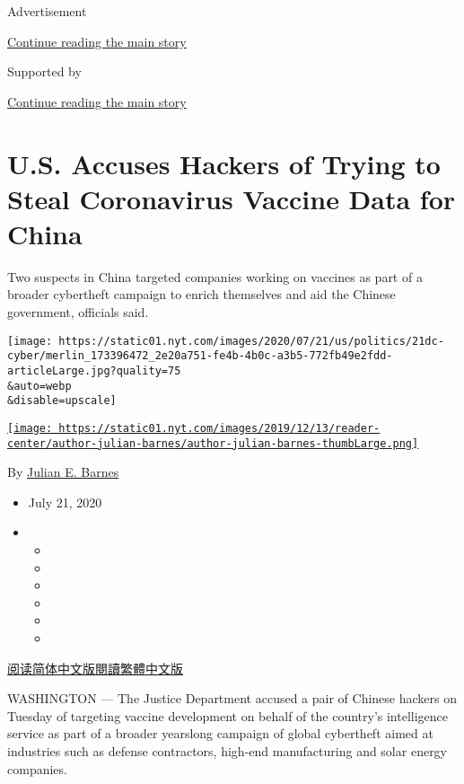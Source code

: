 Advertisement

\protect\hyperlink{after-top}{Continue reading the main story}

Supported by

\protect\hyperlink{after-sponsor}{Continue reading the main story}

\hypertarget{us-accuses-hackers-of-trying-to-steal-coronavirus-vaccine-data-for-china}{%
\section{U.S. Accuses Hackers of Trying to Steal Coronavirus Vaccine
Data for
China}\label{us-accuses-hackers-of-trying-to-steal-coronavirus-vaccine-data-for-china}}

Two suspects in China targeted companies working on vaccines as part of
a broader cybertheft campaign to enrich themselves and aid the Chinese
government, officials said.

\texttt{[image: https://static01.nyt.com/images/2020/07/21/us/politics/21dc-cyber/merlin\_173396472\_2e20a751-fe4b-4b0c-a3b5-772fb49e2fdd-articleLarge.jpg?quality=75\\\&auto=webp\\\&disable=upscale]}

\href{https://www.nytimes.com/by/julian-e-barnes}{\texttt{[image: https://static01.nyt.com/images/2019/12/13/reader-center/author-julian-barnes/author-julian-barnes-thumbLarge.png]}}

By \href{https://www.nytimes.com/by/julian-e-barnes}{Julian E. Barnes}

\begin{itemize}
\item
  July 21, 2020
\item
  \begin{itemize}
  \item
  \item
  \item
  \item
  \item
  \item
  \end{itemize}
\end{itemize}

\href{https://cn.nytimes.com/usa/20200722/china-hacking-coronavirus-vaccine/}{阅读简体中文版}\href{https://cn.nytimes.com/usa/20200722/china-hacking-coronavirus-vaccine/zh-hant/}{閱讀繁體中文版}

WASHINGTON --- The Justice Department accused a pair of Chinese hackers
on Tuesday of targeting vaccine development on behalf of the country's
intelligence service as part of a broader yearslong campaign of global
cybertheft aimed at industries such as defense contractors, high-end
manufacturing and solar energy companies.

